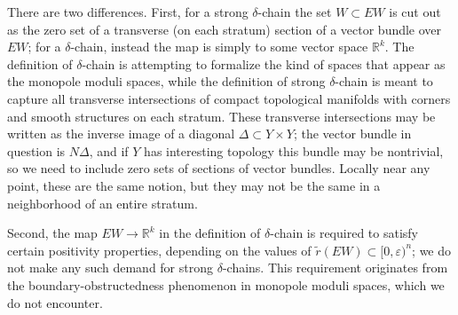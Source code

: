 \documentclass{memo-l}
\theoremstyle{definition}
\theoremstyle{remark}
\numberwithin{section}{chapter}
\numberwithin{equation}{chapter}
\begin{document}
There are two differences. First, for a strong $\delta$-chain the set $W \subset EW$ is cut out as the zero set of a transverse (on each stratum) section of a vector bundle over $EW$; for a $\delta$-chain, instead the map is simply to some vector space $\mathbb R^k$. The definition of $\delta$-chain is attempting to formalize the kind of spaces that appear as the monopole moduli spaces, while the definition of strong $\delta$-chain is meant to capture all transverse intersections of compact topological manifolds with corners and smooth structures on each stratum. These transverse intersections may be written as the inverse image of a diagonal $\Delta \subset Y \times Y$; the vector bundle in question is $N\Delta$, and if $Y$ has interesting topology this bundle may be nontrivial, so we need to include zero sets of sections of vector bundles. Locally near any point, these are the same notion, but they may not be the same in a neighborhood of an entire stratum.

Second, the map $EW \to \mathbb R^k$ in the definition of $\delta$-chain is required to satisfy certain positivity properties, depending on the values of $\tilde r(EW) \subset [0,\varepsilon)^n$; we do not make any such demand for strong $\delta$-chains. This requirement originates from the boundary-obstructedness phenomenon in monopole moduli spaces, which we do not encounter.
\end{document}
